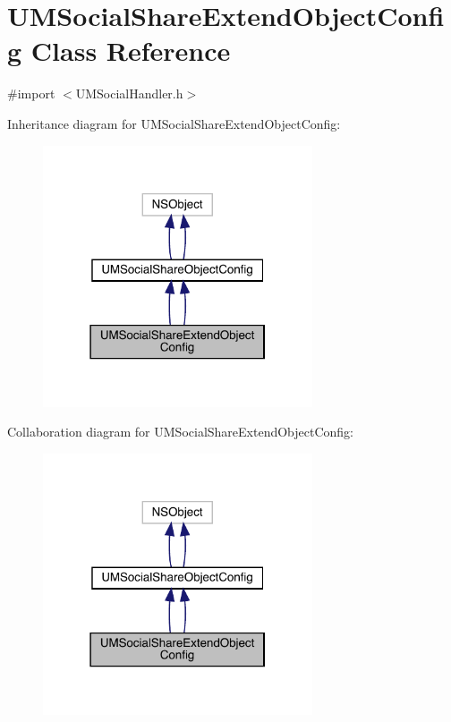\hypertarget{interface_u_m_social_share_extend_object_config}{}\section{U\+M\+Social\+Share\+Extend\+Object\+Config Class Reference}
\label{interface_u_m_social_share_extend_object_config}


{\ttfamily \#import $<$U\+M\+Social\+Handler.\+h$>$}



Inheritance diagram for U\+M\+Social\+Share\+Extend\+Object\+Config\+:\nopagebreak
\begin{figure}[H]
\begin{center}
\leavevmode
\includegraphics[width=226pt]{interface_u_m_social_share_extend_object_config__inherit__graph}
\end{center}
\end{figure}


Collaboration diagram for U\+M\+Social\+Share\+Extend\+Object\+Config\+:\nopagebreak
\begin{figure}[H]
\begin{center}
\leavevmode
\includegraphics[width=226pt]{interface_u_m_social_share_extend_object_config__coll__graph}
\end{center}
\end{figure}

